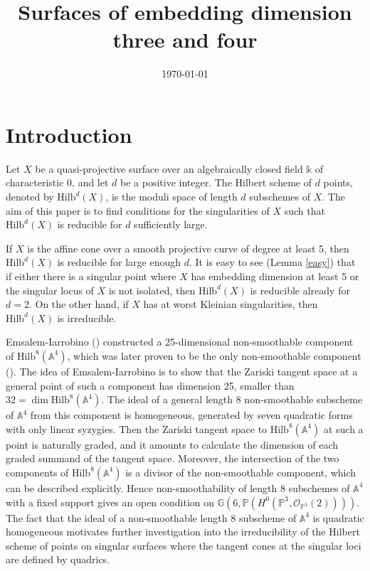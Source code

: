 \documentclass{amsart}[12pt]
\theoremstyle{definition}
\theoremstyle{remark}
\numberwithin{equation}{section}
\begin{document}
\title[Surfaces of embedding dimension three and four]{Surfaces of embedding dimension three and four}%

\maketitle
\date{\today}%

\section{Introduction}
Let $X$ be a quasi-projective surface over an algebraically closed field $\mathbb{k}$ of characteristic 0, and let $d$ be a positive integer. The Hilbert scheme of $d$ points, denoted by $\mathrm{Hilb}^d(X)$, is the moduli space of length $d$ subschemes of $X$. The aim of this paper is to find conditions for the singularities of $X$ such that $\mathrm{Hilb}^d(X)$ is reducible for $d$ sufficiently large.

If $X$ is the affine cone over a smooth projective curve of degree at least 5, then $\mathrm{Hilb}^d(X)$ is reducible for large enough $d$. It is easy to see (Lemma \ref{easy}) that if either there is a singular point where $X$ has embedding dimension at least 5 or the singular locus of $X$ is not isolated, then $\mathrm{Hilb}^d(X)$ is reducible already for $d = 2$. On the other hand, if $X$ has at worst Kleinian singularities, then $\mathrm{Hilb}^d(X)$ is irreducible. 

Emsalem-Iarrobino (\cite{EI78}) constructed a 25-dimensional non-smoothable component of $\mathrm{Hilb}^8(\mathbb{A}^4)$, which was later proven to be the only non-smoothable component (\cite{CEVV}). The idea of Emsalem-Iarrobino is to show that the Zariski tangent space at a general point of such a component has dimension 25, smaller than $32 = \dim \mathrm{Hilb}^8(\mathbb{A}^4)$. The ideal of a general length 8 non-smoothable subscheme of $\mathbb{A}^4$ from this component is homogeneous, generated by seven quadratic forms with only linear syzygies. Then the Zariski tangent space to $\mathrm{Hilb}^8(\mathbb{A}^4)$ at such a point is naturally graded, and it amounts to calculate the dimension of each graded summand of the tangent space. Moreover, the intersection of the two components of $\mathrm{Hilb}^8(\mathbb{A}^4)$ is a divisor of the non-smoothable component, which can be described explicitly. Hence non-smoothability of length $8$ subschemes of $\mathbb{A}^4$ with a fixed support gives an open condition on $\mathbb{G}(6, \mathbb{P}(H^0(\mathbb{P}^3, \mathcal{O}_{\mathbb{P}^3}(2))))$. The fact that the ideal of a non-smoothable length $8$ subscheme of $\mathbb{A}^4$ is quadratic homogeneous motivates further investigation into the irreducibility of the Hilbert scheme of points on singular surfaces where the tangent cones at the singular loci are defined by quadrics. 
\end{document}
